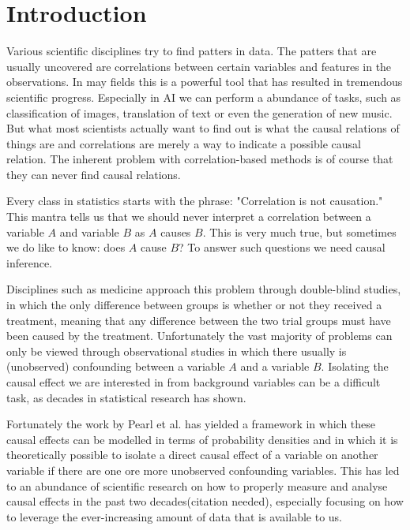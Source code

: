 \documentclass{report}
\begin{document}
\chapter{Introduction}
Various scientific disciplines try to find patters in data. The patters that are usually uncovered are correlations between certain variables and features in the observations. In may fields this is a powerful tool that has resulted in tremendous scientific progress. Especially in AI we can perform a abundance of tasks, such as classification of images, translation of text or even the generation of new music. %
But what most scientists actually want to find out is what the causal relations of things are and correlations are merely a way to indicate a possible causal relation. The inherent problem with correlation-based methods is of course that they can never find causal relations.

Every class in statistics starts with the phrase: "Correlation is not causation." This mantra tells us that we should never interpret a correlation between a variable $A$ and variable $B$ as $A$ causes $B$. This is very much true, but sometimes we do like to know: does $A$ cause $B$? To answer such questions we need causal inference. 

Disciplines such as medicine approach this problem through double-blind studies, in which the only difference between groups is whether or not they received a treatment, meaning that any difference between the two trial groups must have been caused by the treatment. Unfortunately the vast majority of problems can only be viewed through observational studies in which there usually is (unobserved) confounding between a variable $A$ and a variable $B$. Isolating the causal effect we are interested in from background variables can be a difficult task, as decades in statistical research has shown.

Fortunately the work by Pearl et al.\cite{pearl2009causal} \cite{pearl1995causal} has yielded a framework in which these causal effects can be modelled in terms of probability densities and in which it is theoretically possible to isolate a direct causal effect of a variable on another variable if there are one ore more unobserved confounding variables. This has led to an abundance of scientific research on how to properly measure and analyse causal effects in the past two decades(citation needed), especially focusing on how to leverage the ever-increasing amount of data that is available to us. 


\end{document}
